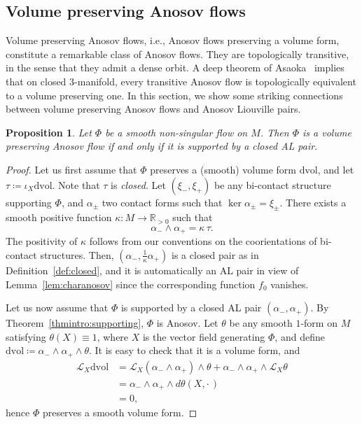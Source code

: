 \documentclass[letterpaper, 11pt]{article}
\numberwithin{equation}{section}
\newtheorem{prop}[thm]{Proposition}
\newcommand{\R}{\mathbb{R}}
\begin{document}
		\subsection{Volume preserving Anosov flows}
		
Volume preserving Anosov flows, i.e., Anosov flows preserving a volume form, constitute a remarkable class of Anosov flows. They are topologically transitive, in the sense that they admit a dense orbit. A deep theorem of Asaoka~\cite{A08} implies that on closed $3$-manifold, every transitive Anosov flow is topologically equivalent to a volume preserving one. In this section, we show some striking connections between volume preserving Anosov flows and Anosov Liouville pairs.

\begin{prop} \label{prop:volume}
Let $\Phi$ be a smooth non-singular flow on $M$. Then $\Phi$ is a volume preserving Anosov flow if and only if it is supported by a closed AL pair.
\end{prop}

\begin{proof}
Let us first assume that $\Phi$ preserves a (smooth) volume form $\mathrm{dvol}$, and let $\tau \coloneqq \iota_X \mathrm{dvol}$. Note that $\tau$ is \emph{closed}. Let $(\xi_-, \xi_+)$ be any bi-contact structure supporting $\Phi$, and $\alpha_\pm$ two contact forms such that $\ker \alpha_\pm = \xi_\pm$. There exists a smooth positive function $\kappa : M \rightarrow \R_{>0}$ such that 
$$\alpha_- \wedge \alpha_+ = \kappa \, \tau.$$ 
The positivity of $\kappa$ follows from our conventions on the coorientations of bi-contact structures. Then, $\left(\alpha_-, \frac{1}{\kappa} \alpha_+\right)$ is a closed pair as in Definition~\ref{def:closed}, and it is automatically an AL pair in view of Lemma~\ref{lem:charanosov} since the corresponding function $f_0$ vanishes.

Let us now assume that $\Phi$ is supported by a closed AL pair $(\alpha_-, \alpha_+)$. By Theorem~\ref{thmintro:supporting}, $\Phi$ is Anosov. Let $\theta$ be any smooth $1$-form on $M$ satisfying $\theta(X) \equiv 1$, where $X$ is the vector field generating $\Phi$, and define $\mathrm{dvol} \coloneqq \alpha_- \wedge \alpha_+ \wedge \theta$. It is easy to check that it is a volume form, and
\begin{align*}
\mathcal{L}_X \mathrm{dvol} &= \mathcal{L}_X(\alpha_- \wedge \alpha_+) \wedge \theta + \alpha_- \wedge \alpha_+ \wedge \mathcal{L}_X \theta \\
&=\alpha_- \wedge \alpha_+ \wedge d\theta(X, \cdot \,) \\
&=0,
\end{align*}
hence $\Phi$ preserves a smooth volume form.
\end{proof}
\end{document}

